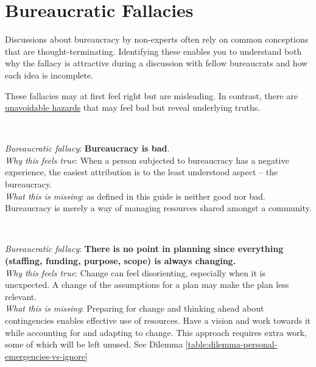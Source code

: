 \section{Bureaucratic Fallacies\label{sec:fallacies}}

Discussions about bureaucracy by non-experts often rely on common conceptions that are \gls{thought-terminating}. Identifying these enables you to understand both why the fallacy is attractive during a discussion with fellow bureaucrats and how each idea is incomplete.

These fallacies may at first feel right but are misleading. In contrast, there are  
\hyperref[sec:unavoidable-hazards]{unavoidable hazards}
\iftoggle{haspagenumbers}{(see page~\pageref{sec:unavoidable-hazards})}{} that may feel bad but reveal underlying truths.

\ \\
\begin{samepage}
\textit{Bureaucratic fallacy}: \textbf{Bureaucracy is bad}. \\
\textit{Why this feels true}: When a person subjected to bureaucracy has a negative experience, the easiest attribution is to the least understood aspect -- the bureaucracy.\\
\textit{What this is missing}: 
\iftoggle{glossarysubstitutionworks}{\Gls{bureaucracy}}{Bureaucracy}
 as defined in this guide is neither good nor bad. Bureaucracy is merely a way of managing  resources shared amongst a community. 
 \end{samepage}

\ \\
\begin{samepage}
\textit{Bureaucratic fallacy}: 
\textbf{There is no point in planning since everything (staffing, funding, purpose, scope) is always changing.}\\
\textit{Why this feels true}: Change can feel disorienting, especially when it is unexpected. A change of the assumptions for a plan may make the plan less relevant. \\
\textit{What this is missing}: Preparing for change and thinking ahead about contingencies enables effective use of resources. Have a vision and work towards it while accounting for and adapting to change. This approach requires extra work, some of which will be left unused. See Dilemma \ref{table:dilemma-personal-emergencies-vs-ignore}\iftoggle{haspagenumbers}{ on page~\pageref{table:dilemma-personal-emergencies-vs-ignore}.}{.}
\end{samepage}


